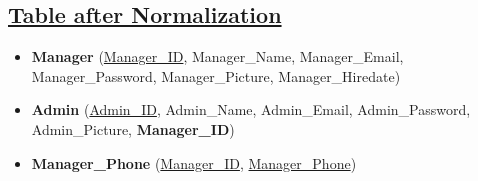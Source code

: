 \subsection*{\underline{Table after Normalization}}
\vskip 0.2in
\begin{itemize}
    \item \textbf{Manager} (\underline{Manager\_ID}, Manager\_Name, Manager\_Email, Manager\_Password, Manager\_Picture, Manager\_Hiredate)
    \item \textbf{Admin} (\underline{Admin\_ID}, Admin\_Name, Admin\_Email, Admin\_Password, Admin\_Picture, \textbf{Manager\_ID})
    \item \textbf{Manager\_Phone} (\underline{Manager\_ID}, \underline{Manager\_Phone})
\end{itemize}

\clearpage